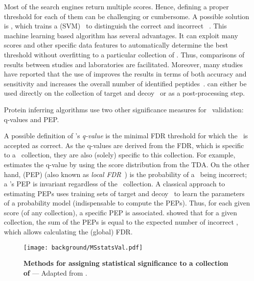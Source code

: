 Most of the search engines return multiple scores.
Hence, defining a proper threshold for each of them can be challenging or cumbersome.
A possible solution is ,
which trains a  (\gls{SVM})~
to distinguish the correct and incorrect \psms{}~.
This machine learning based algorithm has several advantages.
It can exploit many scores and other specific data features
to automatically determine the best threshold
without overfitting to a particular collection of \psms.
Thus, comparisons of results between studies and laboratories are facilitated.
Moreover, many studies have reported that the use of 
improves the results in terms of both accuracy and sensitivity and
increases the overall number of identified peptides~.
 can either be used directly on
the collection of target and decoy \psms\
or as a post-processing step.\mybr\

\vspace{-0.7mm}
Protein inferring algorithms use
two other significance measures for \psm\ validation:
q-values and \gls{PEP}.\mybr\

\vspace{-0.7mm}
A possible definition of \psm's \emph{q-value}\label{qvalP} is
the minimal \gls{FDR} threshold for which the \psm\ is accepted as correct.
As the q-values are derived from the \gls{FDR},
which is specific to a \psm\ collection,
they are also (solely) specific to this collection.
For example,
 estimates the q-value
by using the score distribution from the \gls{TDA}.
On the other hand,
 (\gls{PEP})\label{PEP}
(also known as \emph{local \gls{FDR}}~)
is the probability of a \psm\ being incorrect;
a \psm's \gls{PEP} is invariant regardless of the \psms\ collection.
A classical approach to estimating \glspl{PEP} uses
training sets of target and decoy \psms\ to learn the parameters
of a probability model (indispensable to compute the \glspl{PEP}).
Thus, for each given score (of any collection), a specific \gls{PEP} is associated.
\citet{Choi2008-ec} showed that for a given collection,
the sum of the \glspl{PEP} is equal to the expected number of incorrect \psms,
which allows calculating the (global) \gls{FDR}.\mybr\

\begin{figure}[!htbp]
    \texttt{[image: background/MSstatsVal.pdf]}\centering
    \vspace{-3mm}
    \caption[Methods for assigning statistical significance]{\label{fig:MSstatval}%
    \textbf{Methods for assigning statistical significance to a collection of \psms}
   --- Adapted from \mycite{Kall2008-tf}.}
\end{figure}

